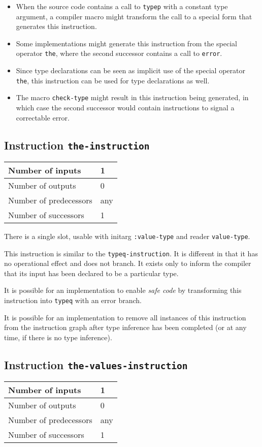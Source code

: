 \begin{itemize}
\item When the source code contains a call to \texttt{typep} with a
  constant type argument, a compiler macro might transform the call to
  a special form that generates this instruction.
\item Some implementations might generate this instruction from the
  special operator \texttt{the}, where the second successor contains a
  call to \texttt{error}.
\item Since type declarations can be seen as implicit use of the
  special operator \texttt{the}, this instruction can be used for type
  declarations as well.
\item The macro \texttt{check-type} might result in this instruction
  being generated, in which case the second successor would contain
  instructions to signal a correctable error.
\end{itemize}

\subsection{Instruction \texttt{the-instruction}}
\label{hir-instruction-the}

\begin{tabular}{|l|l|}
  \hline
  Number of inputs & 1\\
  \hline
  Number of outputs & 0\\
  \hline
  Number of predecessors & any\\
  \hline
  Number of successors & 1\\
  \hline
\end{tabular}

There is a single slot, usable with initarg \texttt{:value-type} and
reader \texttt{value-type}.

This instruction is similar to the \texttt{typeq-instruction}. It is
different in that it has no operational effect and does not branch.
It exists only to inform the compiler that its input has been declared
to be a particular type.

It is possible for an implementation to enable \emph{safe code} by
transforming this instruction into \texttt{typeq} with an error
branch.

It is possible for an implementation to remove all instances of this
instruction from the instruction graph after type inference has been
completed (or at any time, if there is no type inference).

\subsection{Instruction \texttt{the-values-instruction}}
\label{hir-instruction-the-values}
\begin{tabular}{|l|l|}
  \hline
  Number of inputs & 1\\
  \hline
  Number of outputs & 0\\
  \hline
  Number of predecessors & any\\
  \hline
  Number of successors & 1\\
  \hline
\end{tabular}

